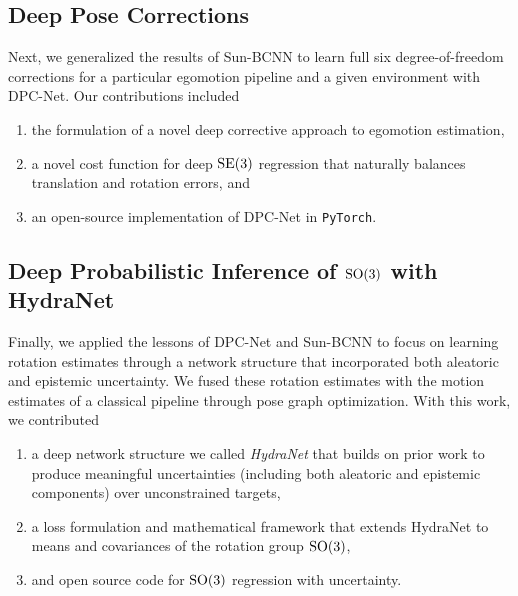 

\subsection{Deep Pose Corrections}

Next, we generalized the results of Sun-BCNN to learn full six degree-of-freedom corrections for a particular egomotion pipeline and a given environment with DPC-Net. Our contributions included

\begin{enumerate}
	\item the formulation of a novel deep corrective approach to egomotion estimation,
	\item a novel cost function for deep $\mathrm{SE}(3)$ regression that naturally balances translation and rotation errors, and
	\item an open-source implementation of DPC-Net in \texttt{PyTorch}.
\end{enumerate}



\subsection{Deep Probabilistic Inference of $\mathrm{SO}(3)$ with HydraNet}


Finally, we applied the lessons of DPC-Net and Sun-BCNN to focus on learning rotation estimates through a network structure that incorporated both aleatoric and epistemic uncertainty. We fused these rotation estimates with the motion estimates of a classical pipeline through pose graph optimization. With this work, we contributed
\begin{enumerate}
\item a deep network structure we called \textit{HydraNet} that builds on prior work to produce meaningful uncertainties (including both aleatoric and epistemic components) over unconstrained targets,
\item a loss formulation and mathematical framework that extends HydraNet to means and covariances of the rotation group $\mathrm{SO}(3)$,
\item and open source code for $\mathrm{SO}(3)$ regression with uncertainty.
\end{enumerate}

